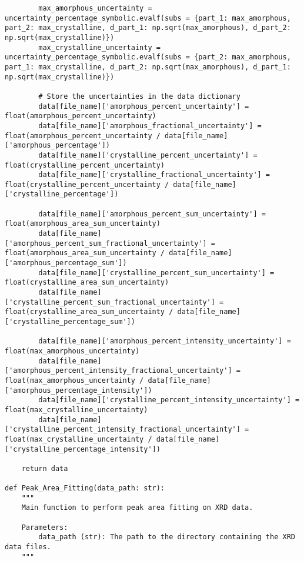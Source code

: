 \begin{small}
\begin{verbatim}
        max_amorphous_uncertainty = uncertainty_percentage_symbolic.evalf(subs = {part_1: max_amorphous, part_2: max_crystalline, d_part_1: np.sqrt(max_amorphous), d_part_2: np.sqrt(max_crystalline)})
        max_crystalline_uncertainty = uncertainty_percentage_symbolic.evalf(subs = {part_2: max_amorphous, part_1: max_crystalline, d_part_2: np.sqrt(max_amorphous), d_part_1: np.sqrt(max_crystalline)})

        # Store the uncertainties in the data dictionary
        data[file_name]['amorphous_percent_uncertainty'] = float(amorphous_percent_uncertainty)
        data[file_name]['amorphous_fractional_uncertainty'] = float(amorphous_percent_uncertainty / data[file_name]['amorphous_percentage'])
        data[file_name]['crystalline_percent_uncertainty'] = float(crystalline_percent_uncertainty)
        data[file_name]['crystalline_fractional_uncertainty'] = float(crystalline_percent_uncertainty / data[file_name]['crystalline_percentage'])

        data[file_name]['amorphous_percent_sum_uncertainty'] = float(amorphous_area_sum_uncertainty)
        data[file_name]['amorphous_percent_sum_fractional_uncertainty'] = float(amorphous_area_sum_uncertainty / data[file_name]['amorphous_percentage_sum'])
        data[file_name]['crystalline_percent_sum_uncertainty'] = float(crystalline_area_sum_uncertainty)
        data[file_name]['crystalline_percent_sum_fractional_uncertainty'] = float(crystalline_area_sum_uncertainty / data[file_name]['crystalline_percentage_sum'])

        data[file_name]['amorphous_percent_intensity_uncertainty'] = float(max_amorphous_uncertainty)
        data[file_name]['amorphous_percent_intensity_fractional_uncertainty'] = float(max_amorphous_uncertainty / data[file_name]['amorphous_percentage_intensity'])
        data[file_name]['crystalline_percent_intensity_uncertainty'] = float(max_crystalline_uncertainty)
        data[file_name]['crystalline_percent_intensity_fractional_uncertainty'] = float(max_crystalline_uncertainty / data[file_name]['crystalline_percentage_intensity'])

    return data
    
def Peak_Area_Fitting(data_path: str):
    """
    Main function to perform peak area fitting on XRD data.

    Parameters:
        data_path (str): The path to the directory containing the XRD data files.
    """


\end{verbatim}
\end{small}
